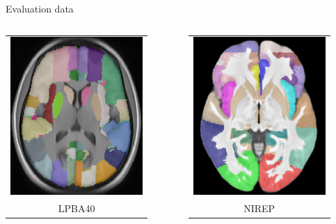 \documentclass[xcolor=dvipsnames,serif,10pt]{beamer}
\begin{document}

\begin{frame}{Evaluation data}
     \begin{columns}[t] %
     \begin{column}[t]{4cm} %
       \begin{tabular}{c}
       \includegraphics[height=6cm]{LPBA40Labels.png} \\
       LPBA40 
       \end{tabular}
     \end{column}
     \begin{column}[t]{5cm} %
       \begin{tabular}{c}
       \includegraphics[height=6cm]{NIREPLabels.png} \\
       NIREP 
       \end{tabular}
     \end{column}
     \end{columns}
\end{frame}

\end{document}
